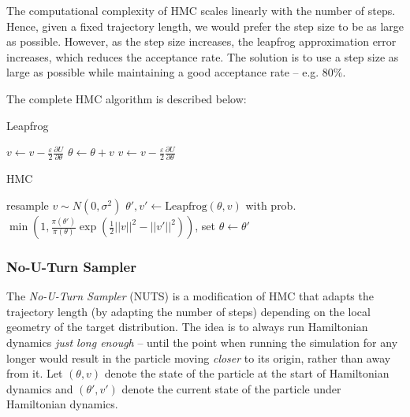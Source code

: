 \documentclass[12pt]{article}
\begin{document}
{The computational complexity of HMC scales linearly with the number of steps. Hence, given a fixed trajectory length, we would prefer the step size to be as large as possible. However, as the step size increases, the leapfrog approximation error increases, which reduces the acceptance rate. The solution is to use a step size as large as possible while maintaining a good acceptance rate -- e.g. $80\%$. \cite{bnn_posterior}

The complete HMC algorithm is described below:
\begin{algorithm}
\caption{Leapfrog}
\label{alg_leapfrog}
\begin{algorithmic}
 
\State $v \gets v - \frac{\varepsilon}{2} \frac{\partial U}{\partial \theta}$ 
\State $\theta \gets \theta + v$ 
\State $v \gets v - \frac{\varepsilon}{2} \frac{\partial U}{\partial \theta}$ 
\EndFor
\end{algorithmic}
\end{algorithm}

\begin{algorithm}
\caption{HMC}
\label{alg_hmc}
\begin{algorithmic}
 
	\State resample $v \sim N(0, \sigma^2)$ 
	\State $\theta', v' \gets \textrm{Leapfrog}(\theta, v)$ 
	\State with prob. $\min{\left(1, \frac{\pi(\theta')}{\pi(\theta)} \exp \left( \frac{1}{2}||v||^2 - ||v'||^2 \right) \right)}$, set $\theta \gets \theta'$ 
\EndFor
\end{algorithmic}
\end{algorithm}

\subsubsection{No-U-Turn Sampler}
\label{sec_nuts}

The \textit{No-U-Turn Sampler} (NUTS) is a modification of HMC that adapts the trajectory length (by adapting the number of steps) depending on the local geometry of the target distribution. \cite{nuts} The idea is to always run Hamiltonian dynamics \textit{just long enough} -- until the point when running the simulation for any longer would result in the particle moving \textit{closer} to its origin, rather than away from it. Let $(\theta, v)$ denote the state of the particle at the start of Hamiltonian dynamics and $(\theta', v')$ denote the current state of the particle under Hamiltonian dynamics.

}
\end{document}
